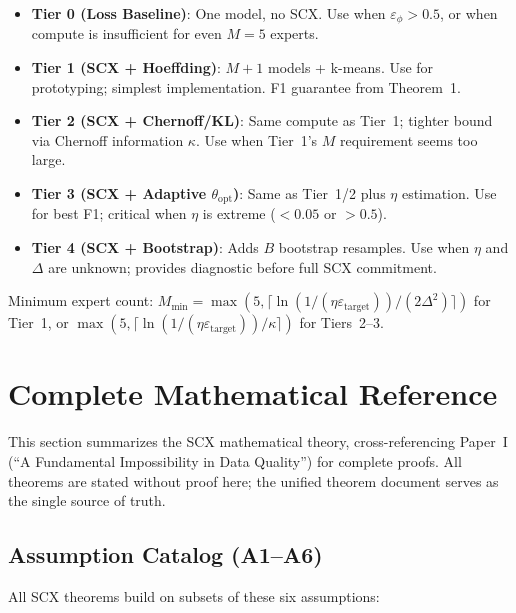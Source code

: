 \documentclass{article}
\begin{document}
\begin{itemize}[nosep]
  \item \textbf{Tier 0 (Loss Baseline)}: One model, no SCX. Use when $\varepsilon_\phi > 0.5$, or when compute is insufficient for even $M=5$ experts.
  \item \textbf{Tier 1 (SCX + Hoeffding)}: $M+1$ models + k-means. Use for prototyping; simplest implementation. F1 guarantee from Theorem~1.
  \item \textbf{Tier 2 (SCX + Chernoff/KL)}: Same compute as Tier~1; tighter bound via Chernoff information $\kappa$. Use when Tier~1's $M$ requirement seems too large.
  \item \textbf{Tier 3 (SCX + Adaptive $\theta_{\text{opt}}$)}: Same as Tier~1/2 plus $\eta$ estimation. Use for best F1; critical when $\eta$ is extreme ($<0.05$ or $>0.5$).
  \item \textbf{Tier 4 (SCX + Bootstrap)}: Adds $B$ bootstrap resamples. Use when $\eta$ and $\Delta$ are unknown; provides diagnostic before full SCX commitment.
\end{itemize}

Minimum expert count: $M_{\min} = \max(5, \lceil \ln(1/(\eta \varepsilon_{\text{target}}))/(2\Delta^2) \rceil)$ for Tier~1, or $\max(5, \lceil \ln(1/(\eta \varepsilon_{\text{target}}))/\kappa \rceil)$ for Tiers~2--3.

\section{Complete Mathematical Reference}
\label{sec:math-ref}

This section summarizes the SCX mathematical theory, cross-referencing Paper~I (``A Fundamental Impossibility in Data Quality'') for complete proofs. All theorems are stated without proof here; the unified theorem document \cite{theorems_unified} serves as the single source of truth.

\subsection{Assumption Catalog (A1--A6)}
\label{sec:assumptions}

All SCX theorems build on subsets of these six assumptions:
\end{document}
